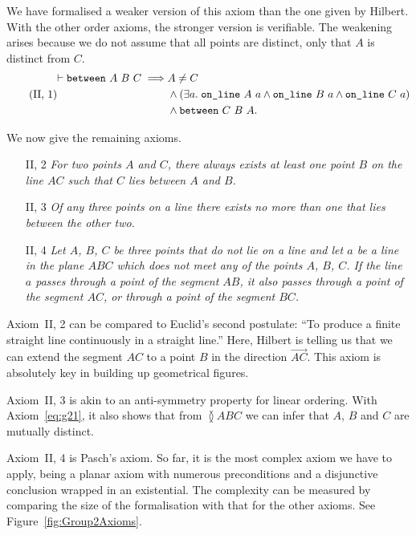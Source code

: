 We have formalised a weaker version of this axiom than the one given by Hilbert. With the other order axioms, the stronger version is verifiable. The weakening arises because we do not assume that all points are distinct, only that $A$ is distinct from $C$.
\begin{equation}\label{eq:g21}
 \tag{II,~1}
  \begin{split}
    \vdash\texttt{between}\ A\ B\ C \implies & A \neq C\\
                               & \wedge (\exists a.\; \texttt{on\_line}\ A\ a \wedge \texttt{on\_line}\ B\ a \wedge \texttt{on\_line}\ C\ a)\\
                               & \wedge \texttt{between}\ C\ B\ A.
  \end{split}
\end{equation}

We now give the remaining axioms.
\begin{enumerate}
  \item[II, 2] \emph{For two points $A$ and $C$, there always exists at least one point $B$ on the line $AC$ such that $C$ lies between $A$ and $B$.}
  \item[II, 3] \emph{Of any three points on a line there exists no more than one that lies between the other two.}
  \item[II, 4] \emph{Let $A$, $B$, $C$ be three points that do not lie on a line and let $a$ be a line in the plane $ABC$ which does not meet any of the points $A$, $B$, $C$. If the line $a$ passes through a point of the segment $AB$, it also passes through a point of the segment $AC$, or through a point of the segment $BC$.}
\end{enumerate}

Axiom~II, 2 can be compared to Euclid's second postulate: ``To produce a finite straight line continuously in a straight line.'' Here, Hilbert is telling us that we can extend the segment $AC$ to a point $B$ in the direction $\overrightarrow{AC}$. This axiom is absolutely key in building up geometrical figures.

Axiom~II, 3 is akin to an anti-symmetry property for linear ordering. With Axiom~\ref{eq:g21}, it also shows that from $\between{A}{B}{C}$ we can infer that $A$, $B$ and $C$ are mutually distinct.

Axiom~II, 4 is Pasch's axiom. So far, it is the most complex axiom we have to apply, being a planar axiom with numerous preconditions and a disjunctive conclusion wrapped in an existential. The complexity can be measured by comparing the size of the formalisation with that for the other axioms. See Figure~\ref{fig:Group2Axioms}.

